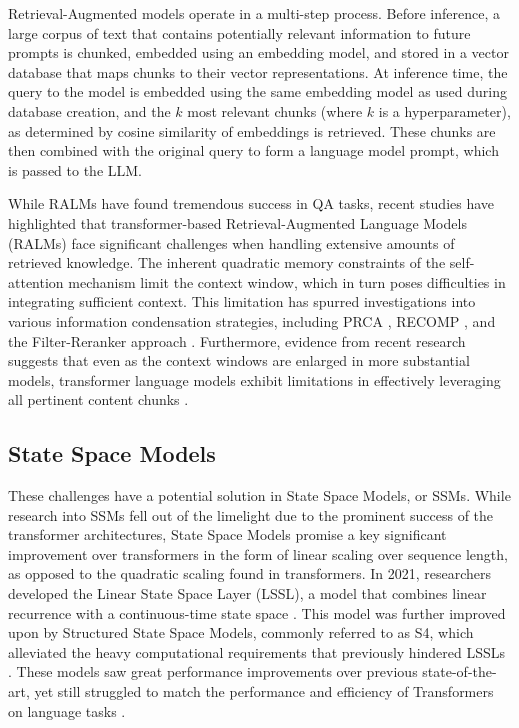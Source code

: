 \documentclass[11pt]{article}
\begin{document}
Retrieval-Augmented models operate in a multi-step process. Before inference, a large corpus of text that contains potentially relevant information to future prompts is chunked, embedded using an embedding model, and stored in a vector database that maps chunks to their vector representations. At inference time, the query to the model is embedded using the same embedding model as used during database creation, and the $k$ most relevant chunks (where $k$ is a hyperparameter), as determined by cosine similarity of embeddings is retrieved. These chunks are then combined with the original query to form a language model prompt, which is passed to the LLM. 

While RALMs have found tremendous success in QA tasks, recent studies have highlighted that transformer-based Retrieval-Augmented Language Models (RALMs) face significant challenges when handling extensive amounts of retrieved knowledge. The inherent quadratic memory constraints of the self-attention mechanism limit the context window, which in turn poses difficulties in integrating sufficient context. This limitation has spurred investigations into various information condensation strategies, including PRCA \cite{yang-etal-2023-prca}, RECOMP \cite{xu2023recomp}, and the Filter-Reranker approach \cite{ma2023large}. Furthermore, evidence from recent research suggests that even as the context windows are enlarged in more substantial models, transformer language models exhibit limitations in effectively leveraging all pertinent content chunks \cite{xu2024retrieval} \cite{liu2023lost}. 

\subsection{State Space Models}

These challenges have a potential solution in State Space Models, or SSMs. While research into SSMs fell out of the limelight due to the prominent success of the transformer architectures, State Space Models promise a key significant improvement over transformers in the form of linear scaling over sequence length, as opposed to the quadratic scaling found in transformers. In 2021, researchers developed the Linear State Space Layer (LSSL), a model that combines linear recurrence with a continuous-time state space \cite{gu2021combining}. This model was further improved upon by Structured State Space Models, commonly referred to as S4, which alleviated the heavy computational requirements that previously hindered LSSLs \cite{gu2022}. These models saw great performance improvements over previous state-of-the-art, yet still struggled to match the performance and efficiency of Transformers on language tasks \cite{gu2023mamba}.
\end{document}
